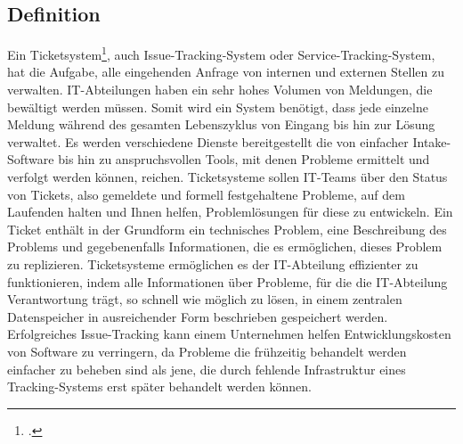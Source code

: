 \subsection{Definition}
Ein Ticketsystem\footcite{issuetracking}, auch Issue-Tracking-System oder Service-Tracking-System, hat die Aufgabe, alle eingehenden Anfrage von internen und externen Stellen zu verwalten. IT-Abteilungen haben ein sehr hohes Volumen von Meldungen, die bewältigt werden müssen. Somit wird ein System benötigt, dass jede einzelne Meldung während des gesamten Lebenszyklus von Eingang bis hin zur Lösung verwaltet.
Es werden verschiedene Dienste bereitgestellt die von einfacher Intake-Software bis hin zu anspruchsvollen Tools, mit denen Probleme ermittelt und verfolgt werden können, reichen.
Ticketsysteme sollen IT-Teams über den Status von Tickets, also gemeldete und formell festgehaltene Probleme, auf dem Laufenden halten und Ihnen helfen, Problemlösungen für diese zu entwickeln. 
Ein Ticket enthält in der Grundform ein technisches Problem, eine Beschreibung des Problems und gegebenenfalls Informationen, die es ermöglichen, dieses Problem zu replizieren.
Ticketsysteme ermöglichen es der IT-Abteilung effizienter zu funktionieren, indem alle Informationen über Probleme, für die die IT-Abteilung Verantwortung trägt, so schnell wie möglich zu lösen, in einem zentralen Datenspeicher in ausreichender Form beschrieben gespeichert werden.
Erfolgreiches Issue-Tracking kann einem Unternehmen helfen Entwicklungskosten von Software zu verringern, da Probleme die frühzeitig behandelt werden einfacher zu beheben sind als jene, die durch fehlende Infrastruktur eines Tracking-Systems erst später behandelt werden können.

